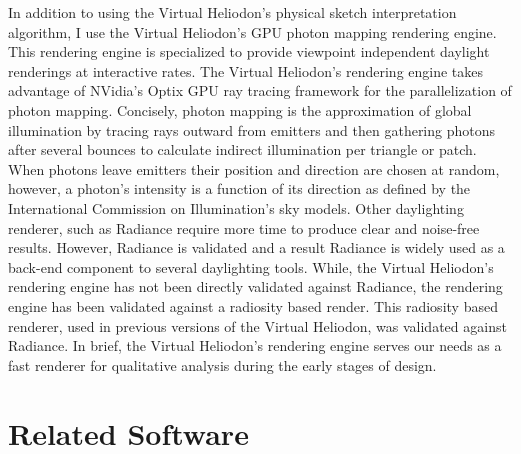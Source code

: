	In addition to using the Virtual Heliodon's physical sketch interpretation algorithm, I use the Virtual Heliodon's GPU photon mapping rendering engine\cite{li2011photon,nasman2013physical}. 
	This rendering engine is specialized to provide viewpoint independent daylight renderings at interactive rates.
	The Virtual Heliodon's rendering engine takes advantage of NVidia's Optix GPU ray tracing framework for the parallelization of photon mapping\cite{parker2010optix}.
	Concisely, photon mapping is the approximation of global illumination by tracing rays outward from emitters and then gathering photons after several bounces to calculate indirect illumination per triangle or patch\cite{hachisuka2008progressive}.
	When photons leave emitters their position and direction are chosen at random, however, a photon's intensity is a function of its direction as defined by the International Commission on Illumination's sky models\cite{de1994spatial}. 
	Other daylighting renderer, such as Radiance require more time to produce clear and noise-free results\cite{compagnon1997radiance}. 
	However, Radiance is validated and a result Radiance is widely used as a back-end component to several daylighting tools\cite{reinhart2006development, Galasiu}.
	While, the Virtual Heliodon's rendering engine has not been directly validated against Radiance, the rendering engine has been validated against a radiosity based render.
	This radiosity based renderer, used in previous versions of the Virtual Heliodon, was validated against Radiance\cite{sheng2010global}. 
	In brief, the Virtual Heliodon's rendering engine serves our needs as a fast renderer for qualitative analysis during the early stages of design.

\section{Related Software}

